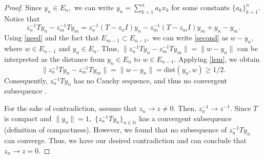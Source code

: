 \documentclass[12pt,a4paper]{article}
\theoremstyle{boldthm}
\theoremstyle{bolddefn}
\begin{document}
\begin{proof}
    Since $y_n \in E_n,$ we can write $y_n = \sum_{k=1}^{n} a_k x_k$ for some constants $\{a_k\}_{k=1}^{n}.$
  Notice that
    \begin{equation} \label{second}
        z_n^{-1} T y_n - z_m^{-1} T y_m =  z_n^{-1}(T - z_nI)y_n - z_m^{-1} (T - z_mI)y_m + y_n - y_m.
    \end{equation}
    Using \eqref{need} and the fact that $E_{m-1} \subset E_{n-1},$ we can write \eqref{second} as $w - y_n,$ where $w \in E_{n-1}$ and $y_n \in E_n.$
     Thus, $\|z_n^{-1} T y_n - z_m^{-1} T y_m\| = \| w - y_n \|$ can be interpreted as the distance from $y_n \in E_n$ to $w \in E_{n-1}.$ Applying \eqref{lem}, we obtain
    \begin{equation}
       \| z_n^{-1} T y_n - z_m^{-1} T y_m \| = \| w - y_n \| = \text{dist}( y_n, w) \ge 1/2.
    \end{equation}
    Consequently, $z_n^{-1} T y_n$ has no Cauchy sequence, and thus no convergent subsequence \cite[1.4-5]{krey}.

        For the sake of contradiction, assume that $z_n \rightarrow z \ne 0.$ Then, $z_n^{-1} \rightarrow z^{-1}.$ Since $T$ is compact and $\|y_n \| = 1,$ $\{ z_n^{-1} T y_n\}_{n \in \mathbb{N}}$ has a convergent subsequence (definition of compactness). However, we found that no subsequence of $z_n^{-1} T y_n$ can converge. Thus, we have our desired contradiction and can conclude that $z_n \rightarrow z=0.$



    

\end{proof}
\end{document}
